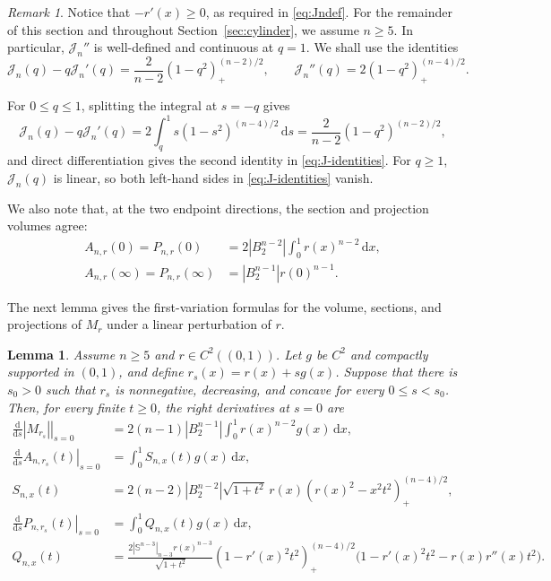 \documentclass[11pt]{article}
\newtheorem{lemma}[theorem]{Lemma}
\theoremstyle{remark}
\newtheorem{remark}[theorem]{Remark}
\newcommand{\Sph}{\mathbb{S}}
\newcommand{\dd}{\,\mathrm{d}}
\newcommand{\pos}[1]{(#1)_{+}}
\begin{document}
\begin{remark}
Notice that $-r'(x)\geq0$, as required in \eqref{eq:Jndef}.  For the remainder of this section and throughout
Section~\ref{sec:cylinder}, we assume $n\geq5$. In particular, $\mathcal J_n''$ is
well-defined and continuous at $q=1$.  We shall use the identities
\begin{equation}\label{eq:J-identities}
 \mathcal J_n(q)-q\mathcal J_n'(q)
 =\frac{2}{n-2}\pos{1-q^2}^{(n-2)/2},
 \qquad
 \mathcal J_n''(q)=2\pos{1-q^2}^{(n-4)/2}.
\end{equation}

For $0\leq q\leq1$, splitting the integral at $s=-q$ gives
\[
 \mathcal J_n(q)-q\mathcal J_n'(q)
 =2\int_q^1s(1-s^2)^{(n-4)/2}\dd s
 =\frac{2}{n-2}(1-q^2)^{(n-2)/2},
\]
and direct differentiation gives the second identity in
\eqref{eq:J-identities}.  For $q\geq1$, $\mathcal J_n(q)$ is linear, so both
left-hand sides in \eqref{eq:J-identities} vanish.

We also note that, at the two endpoint directions, the section and
projection volumes agree:
\[
\begin{aligned}
 A_{n,r}(0)=P_{n,r}(0)
 &=2|B_2^{n-2}|\int_0^1r(x)^{n-2}\dd x,\\
 A_{n,r}(\infty)=P_{n,r}(\infty)
 &=|B_2^{n-1}|r(0)^{n-1}.
\end{aligned}
\]
\end{remark}
The next lemma gives the first-variation formulas for the volume, sections,
and projections of $M_r$ under a linear perturbation of $r$.
\begin{lemma}\label{lem:first-variations}
Assume $n\geq5$ and $r\in C^2((0,1))$.  Let $g$ be $C^2$ and
compactly supported in $(0,1)$, and define
$r_s(x)=r(x)+s g(x)$.  Suppose that there is $s_0>0$ such that
$r_s$ is nonnegative, decreasing, and concave for every
$0\leq s<s_0$.  Then, for every finite $t\geq0$, the right derivatives at $s=0$ are
\begin{align}
 \left.\frac{\mathrm d}{\mathrm d s}|M_{r_s}|\right|_{s=0}
 &=2(n-1)|B_2^{n-1}|\int_0^1r(x)^{n-2}g(x)\dd x,
 \label{eq:dV-general}\\
 \left.\frac{\mathrm d}{\mathrm d s}A_{n,r_s}(t)\right|_{s=0}
 &=\int_0^1S_{n,x}(t)g(x)\dd x,
 \label{eq:dA-general}\\
 S_{n,x}(t)
 &=2(n-2)|B_2^{n-2}|\sqrt{1+t^2}\,
 r(x)\pos{r(x)^2-x^2t^2}^{(n-4)/2},
 \label{eq:S-kernel}\\
 \left.\frac{\mathrm d}{\mathrm d s}P_{n,r_s}(t)\right|_{s=0}
 &=\int_0^1Q_{n,x}(t)g(x)\dd x,
 \label{eq:dP-general}\\
 Q_{n,x}(t)
 &=\frac{2|\Sph^{n-3}|_{n-3}r(x)^{n-3}}
         {\sqrt{1+t^2}}
 \pos{1-r'(x)^2t^2}^{(n-4)/2}
 \bigl(1-r'(x)^2t^2-r(x)r''(x)t^2\bigr).
 \label{eq:Q-kernel}
\end{align}
\end{lemma}
\end{document}
